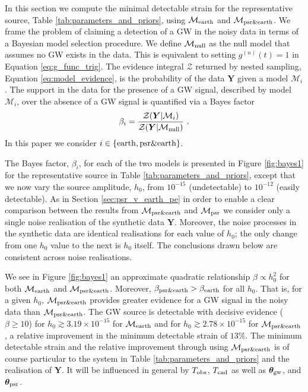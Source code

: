 \documentclass[fleqn,usenatbib,useAMS]{mnras}
\begin{document}
In this section we compute the minimal detectable strain for the representative source, Table \ref{tab:parameters_and_priors}, using $\mathcal{M}_{\rm earth}$ and $\mathcal{M}_{\rm psr \& earth}$. We frame the problem of claiming a detection of a GW in the noisy data in terms of a Bayesian model selection procedure. We define $\mathcal{M}_{\rm null}$ as the null model that assumes no GW exists in the data. This is equivalent to setting $g^{(n)}(t)=1$ in Equation \eqref{eq:g_func_trig}. The evidence integral $\mathcal{Z}$ returned by nested sampling, Equation \eqref{eq:model_evidence}, is the probability of the data $\boldsymbol{Y}$ given a model $\mathcal{M}_i$. The support in the data for the presence of a GW signal, described by model $\mathcal{M}_i$, over the absence of a GW signal is quantified via a Bayes factor
		\begin{equation}
			\beta_i = \frac{\mathcal{Z}(\boldsymbol{Y} | \mathcal{M}_i)}{\mathcal{Z}(\boldsymbol{Y} | \mathcal{M}_{\rm null})} \ . \label{eq:bayes}
		\end{equation}
In this paper we consider $i \in \left \{ \rm earth,psr \& earth \right \}$. \newline 
	
	
The Bayes factor, $\beta_i$, for each of the two models is presented in Figure \ref{fig:bayes1} for the representative source in Table \ref{tab:parameters_and_priors}, except that we now vary the source amplitude, $h_0$, from $10^{-15}$ (undetectable) to $10^{-12}$ (easily detectable). As in Section \ref{sec:psr_v_earth_pe} in order to enable a clear comparison between the results from $\mathcal{M}_{\rm psr \& earth}$ and $\mathcal{M}_{\rm psr}$ we consider only a single noise realisation of the synthetic data $\boldsymbol{Y}$. Moreover, the noise processes in the synthetic data are identical realisations for each value of $h_0$; the only change from one $h_0$ value to the next is $h_0$ itself. The conclusions drawn below are consistent across noise realisations. \newline 


We see in Figure \ref{fig:bayes1} an approximate quadratic relationship $\beta \propto h_0^2$ for both $\mathcal{M}_{\rm earth}$ and $\mathcal{M}_{\rm psr \& earth}$. Moreover, $\beta_{\rm psr \& earth} > \beta_{\rm earth}$ for all $h_0$. That is, for a given $h_0$, $\mathcal{M}_{\rm psr \& earth}$ provides greater evidence for a GW signal in the noisy data than $\mathcal{M}_{\rm psr \& earth}$. The GW source is detectable with decisive evidence ($\beta \geq 10$) for $h_0 \gtrsim 3.19 \times 10^{-15}$ for  $\mathcal{M}_{\rm earth}$ and for $h_0 \gtrsim 2.78 \times 10^{-15}$ for  $\mathcal{M}_{\rm psr \& earth}$, a relative improvement in the minimum detectable strain of $13\%$. The minimum detectable strain and the relative improvement through using $\mathcal{M}_{\rm psr \& earth}$ is of course particular to the system in Table \ref{tab:parameters_and_priors} and the realisation of $\boldsymbol{Y}$. It will be influenced in general by $T_{\rm obs}$, $T_{\rm cad}$ as well as ${\boldsymbol{\theta}}_{\rm gw}$, and ${\boldsymbol{\theta}}_{\rm psr}$. 
		
\end{document}
